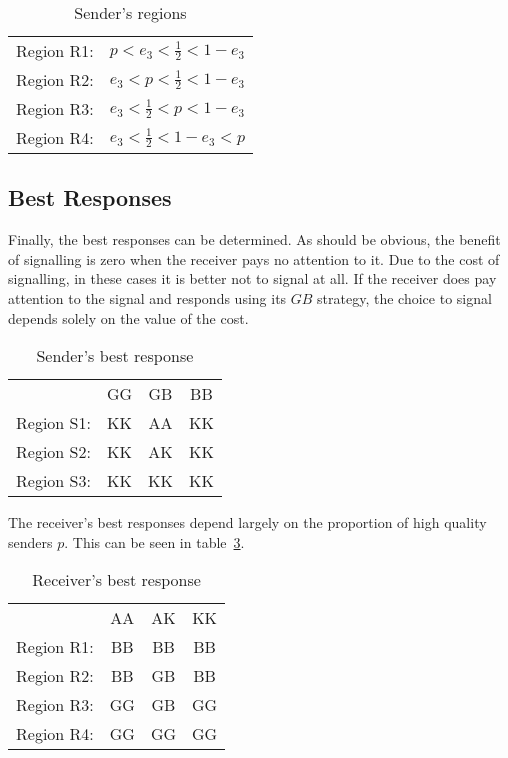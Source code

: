 \documentclass[a4paper,12pt]{article}
\numberwithin{equation}{section}
\begin{document}
\begin{table}[h]
\begin{center}
\begin{tabular}{lc}
Region R1: & $p<e_{3}<\frac{1}{2}<1-e_{3}$\\
Region R2: & $e_{3}<p<\frac{1}{2}<1-e_{3}$\\
Region R3: & $e_{3}<\frac{1}{2}<p<1-e_{3}$\\
Region R4: & $e_{3}<\frac{1}{2}<1-e_{3}<p$
\end{tabular}
\end{center}
\caption{Sender's regions}
\label{tab:SignallingGame/RegionsR}
\end{table}


\subsection{Best Responses}
\label{sec:Signalling Game/Best Response}

Finally, the best responses can be determined. As should be obvious, the benefit of signalling is zero when the receiver pays no attention to it. Due to the cost of signalling, in these cases it is better not to signal at all. If the receiver does pay attention to the signal and responds using its $GB$ strategy, the choice to signal depends solely on the value of the cost.

\vspace{20mm}

\begin{table}[h]
\begin{center}
\begin{tabular}{lccc}
 & GG & GB & BB\\
Region S1: & KK & AA & KK\\
Region S2: & KK & AK & KK\\
Region S3: & KK & KK & KK
\end{tabular}
\end{center}
\caption{Sender's best response}
\label{tab:SignallingGame/BestResponseS}
\end{table}

The receiver's best responses depend largely on the proportion of high quality senders $p$. This can be seen in table~\ref{tab:SignallingGame/BestResponseR}.

\begin{table}[h]
\begin{center}
\begin{tabular}{lccc}
 & AA & AK & KK\\
Region R1: & BB & BB & BB\\
Region R2: & BB & GB & BB\\
Region R3: & GG & GB & GG\\
Region R4: & GG & GG & GG
\end{tabular}
\end{center}
\caption{Receiver's best response}
\label{tab:SignallingGame/BestResponseR}
\end{table}
\end{document}
